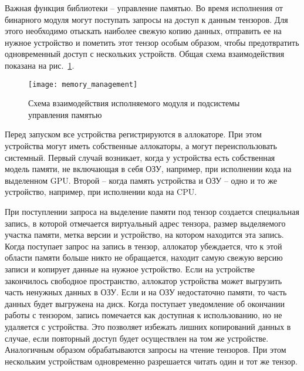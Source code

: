 Важная функция библиотеки -- управление памятью. Во время исполнения от бинарного
модуля могут поступать запросы на доступ к данным тензоров. Для этого необходимо
отыскать наиболее свежую копию данных, отправить ее на нужное устройство и
пометить этот тензор особым образом, чтобы предотвратить одновременный доступ
с нескольких устройств. Общая схема взаимодействия показана на 
рис.~\ref{fig:memory_management}.

\begin{figure}[h]
  \centering
  \texttt{[image: memory\_management]}
  \caption{Схема взаимодействия исполняемого модуля и подсистемы управления памятью}
  \label{fig:memory_management}
\end{figure}

Перед запуском все устройства регистрируются в аллокаторе. При этом устройства
могут иметь собственные аллокаторы, а могут переиспользовать системный. Первый
случай возникает, когда у устройства есть собственная модель памяти, не
включающая в себя ОЗУ, например, при исполнении кода на выделенном GPU. Второй --
когда память устройства и ОЗУ -- одно и то же устройство, например, при
исполнении кода на CPU.

При поступлении запроса на выделение памяти под тензор создается специальная
запись, в которой отмечается виртуальный адрес тензора, размер выделяемого
участка памяти, метка версии и устройство, на котором находится эта запись.
Когда поступает запрос на запись в тензор, аллокатор убеждается, что к этой
области памяти больше никто не обращается, находит самую свежую версию записи
и копирует данные на нужное устройство. Если на устройстве закончилось свободное
пространство, аллокатор устройства может выгрузить часть ненужных данных в ОЗУ.
Если и на ОЗУ недостаточно памяти, то часть данных будет выгружена на диск.
Когда поступает уведомление об окончании работы с тензором, запись помечается
как доступная к использованию, но не удаляется с устройства. Это позволяет
избежать лишних копирований данных в случае, если повторный доступ будет
осуществлен на том же устройстве. Аналогичным образом обрабатываются запросы
на чтение тензоров. При этом нескольким устройствам одновременно разрешается
читать один и тот же тензор.
